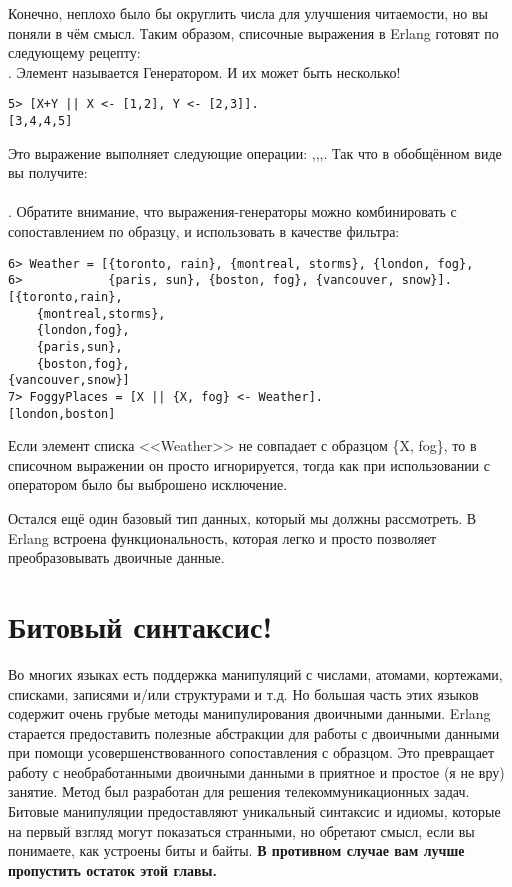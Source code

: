 Конечно, неплохо было бы округлить числа для улучшения читаемости, но вы поняли в чём смысл.
Таким образом, списочные выражения в Erlang готовят по следующему рецепту: \ops{NewList = [Expression || Pattern}\\ 
\ops{ $<-$ List, Condition1, Condition2, ... ConditionN]}.
Элемент  называется Генератором.
И их может быть несколько!\\ 
\begin{lstlisting}[style=repl]
5> [X+Y || X <- [1,2], Y <- [2,3]].
[3,4,4,5]
\end{lstlisting}

Это выражение выполняет следующие операции: ,,,.
Так что в обобщённом виде вы получите: \\ 
\ops{[Expression || GeneratorExp1, GeneratorExp2, ..., GeneratorExpN,}\\ 
\ops{Condition1, Condition2, ... ConditionM]}.
Обратите внимание, что выражения\--генераторы можно комбинировать с сопоставлением по образцу, и использовать в качестве фильтра:
\begin{lstlisting}[style=repl]
6> Weather = [{toronto, rain}, {montreal, storms}, {london, fog},  
6>            {paris, sun}, {boston, fog}, {vancouver, snow}].
[{toronto,rain},
    {montreal,storms},
    {london,fog},
    {paris,sun},
    {boston,fog},
{vancouver,snow}]
7> FoggyPlaces = [X || {X, fog} <- Weather].
[london,boston]
\end{lstlisting}

Если элемент списка <<Weather>> не совпадает с образцом \{X, fog\}, то в списочном выражении он просто игнорируется, тогда как при использовании с оператором \ops{=} было бы выброшено исключение.

Остался ещё один базовый тип данных, который мы должны рассмотреть.
В Erlang встроена функциональность, которая легко и просто позволяет преобразовывать двоичные данные.
\section{Битовый синтаксис!}
Во многих языках есть поддержка манипуляций с числами, атомами, кортежами, списками, записями и/или структурами и т.д.
Но большая часть этих языков содержит очень грубые методы манипулирования двоичными данными.
Erlang старается предоставить полезные абстракции для работы с двоичными данными при помощи усовершенствованного сопоставления с образцом.
Это превращает работу с необработанными двоичными данными в приятное и простое (я не вру) занятие.
Метод был разработан для решения телекоммуникационных задач.
Битовые манипуляции предоставляют уникальный синтаксис и идиомы, которые на первый взгляд могут показаться странными, но обретают смысл, если вы понимаете, как устроены биты и байты.
\textbf{В противном случае вам лучше пропустить остаток этой главы.}

